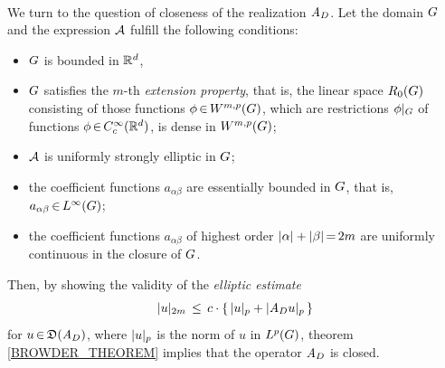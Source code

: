 \documentclass[11pt,twoside]{article}
\begin{document}
\paragraph{} %
We turn to the question of closeness of the realization $\mathit{A}_D$.
Let the domain $G$ and the expression ${\mathcal{A}}$ fulfill the following conditions:

\begin{itemize}[leftmargin=9mm]
\item[(I)\;\;]
$G$ is bounded in ${\mathbb{R}}^d$,

\item[(I')\;\,]
$G$ satisfies the $m$-th \textit{extension property},
that is,
the linear space $R_0(G)$ consisting
of those functions $\phi {\,\in\,} W^{m,p}(G)$,
which are restrictions $\phi |_{G}$
of functions $\phi {\,\in\,} C_c^{\infty}({\mathbb{R}}^d)$,
is dense in $W^{m,p}(G)$;

\item[(II)\;]
${\mathcal{A}}$ is uniformly strongly elliptic in $G$;

\item[(III)\,]
the coefficient functions $a_{\alpha \beta}$ are essentially bounded in $G$,
that is,
$a_{\alpha \beta} {\,\in\,} L^{\infty}(G)$;

\item[(III')]
the coefficient functions $a_{\alpha \beta}$ of highest order
$\abs{\alpha} + \abs{\beta} \eq 2m$
are uniformly continuous in the closure of $G$.
\end{itemize}

Then,
by showing the validity of the \textit{elliptic estimate}
\[
\abs{u} _{2m} \, \leq \, c \cdot \{ \,\abs{u} _p + \abs{\linA_D u} _p \, \}
\]
for $u {\,\in\,} \mathfrak{D}(\mathit{A}_D)$,
where $\abs{u} _p$ is the norm of $u$ in $L^p(G)$,
theorem \ref{BROWDER_THEOREM} implies that the operator $\mathit{A}_D$ is closed.

\end{document}
